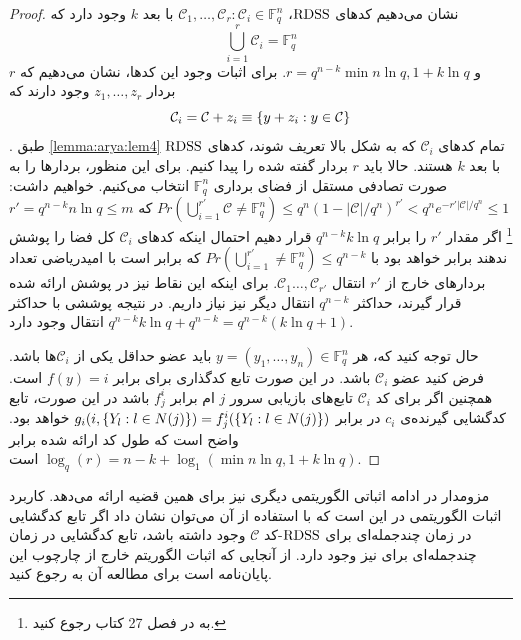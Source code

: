  \begin{proof}
 	نشان می‌دهیم کدهای
 	$\mathrm{RDSS}$،
 	$\mathcal{C}_1, \dots, \mathcal{C}_r: \mathcal{C}_i \in \mathbb{F}_q^n$
 	با بعد
 	$k$
 	وجود دارد که
 	\begin{equation}
 		\bigcup_{i = 1}^r \mathcal{C}_i = \mathbb{F}_q^n
 	\end{equation}
 	و 
 	$r = q^{n - k} \min{n \ln q, 1 + k \ln q}$.
 	برای اثبات وجود این کدها، نشان می‌دهیم که
 	$r$
 	بردار
 	$z_1, \dots, z_r$
 	وجود دارند که
 	\begin{equation}
 		\mathcal{C}_i = \mathcal{C} + z_i \equiv \left\{ y + z_i: y \in \mathcal{C} \right\}
 	\end{equation}.
 	طبق
 	\autoref{lemma:arya:lem4}
 	تمام کدهای
 	$\mathcal{C}_i$
 	که به شکل بالا تعریف شوند، کدهای
 	$\mathrm{RDSS}$
 	با بعد
 	$k$
 	هستند.	 حالا باید $r$ بردار گفته شده را پیدا کنیم. برای این منظور، بردارها را به صورت تصادفی مستقل از فضای برداری
 	$\mathbb{F}_q^n$
 	انتخاب می‌کنیم. خواهیم داشت:
 	$Pr(\bigcup_{i = 1}^{r'} \mathcal{C} \ne \mathbb{F}_q^n) \leq q^n (1 - |\mathcal{C}|/q^n)^{r'} < q^n e^{- r' |\mathcal{C}| / q^n} \leq 1$
 	که
 	$r' = q^{n - k} n \ln q \leq m$\footnote{
 	به
 	در فصل 27 کتاب
 	\cite{graham1995handbook}
 	رجوع کنید.
 	}
 	اگر مقدار
 	$r'$
 	را برابر
 	$q^{n - k} k \ln q$
 	قرار دهیم احتمال اینکه کدهای
 	$\mathcal{C}_i$
 	کل فضا را پوشش ندهند برابر خواهد بود با
 	$Pr(\bigcup_{i = 1}^{r'} \ne \mathbb{F}_q^n) \leq q^{n - k}$
 	که برابر است با امیدریاضی تعداد بردارهای خارج از 
 	$r'$
 	انتقال
 	$\mathcal{C}_1\ldots, \mathcal{C}_{r'}$.
 	برای اینکه این نقاط نیز در پوشش ارائه شده قرار گیرند، حداکثر 
 	$q^{n - k}$
 	 انتقال دیگر نیز نیاز داریم. در نتیجه پوششی با حداکثر
 	 $q^{n - k} k \ln q + q^{n - k} = q^{n - k}(k \ln q + 1)$
 	 انتقال وجود دارد.
 	 
 	 حال توجه کنید که، هر
 	 $y = (y_1, \dots, y_n) \in \mathbb{F}_q^n$
 	 باید عضو حداقل یکی از
 	 $\mathcal{C}_i$ها
 	 باشد. فرض کنید عضو
 	 $\mathcal{C}_i$
 	 باشد. در این صورت تابع کدگذاری برای
 	 \icod
 	 برابر
 	 $f(y) = i$
 	 است. همچنین اگر برای کد
 	 $\mathcal{C}_i$
 	  تابع‌های بازیابی سرور
 	  $j$
 	  ام برابر
 	 $f_j^i$
 	 باشد در این صورت، تابع کدگشایی گیرنده‌ی
 	 $c_i$
 	 در
 	 \icod
 	 برابر
 	 $g_i(i, \left\{ Y_l: l \in N(j) \right\}) = f_j^i(\left\{ Y_l: l \in N(j) \right\})$
 	 	خواهد بود.
 	 	واضح است که طول کد 
 	 	\icod
 	 	ارائه شده برابر
 	 	$\log_q(r) = n - k + \log_1(\min{n \ln q, 1 + k \ln q})$
 	 	است.
 \end{proof}
 مزومدار در ادامه اثباتی الگوریتمی دیگری نیز برای همین قضیه ارائه می‌دهد. کاربرد اثبات الگوریتمی در این است که با استفاده از آن می‌توان نشان داد اگر تابع کدگشایی در زمان چندجمله‌ای برای 
 $\mathrm{RDSS}$-کد
 $\mathcal{C}$
 وجود داشته باشد، تابع کدگشایی در زمان چندجمله‌ای برای
 \icod
 نیز وجود دارد. از آنجایی که اثبات الگوریتم خارج از چارچوب این پایان‌نامه است برای مطالعه آن به
 \cite{arya}
 رجوع کنید.
 \newpage
